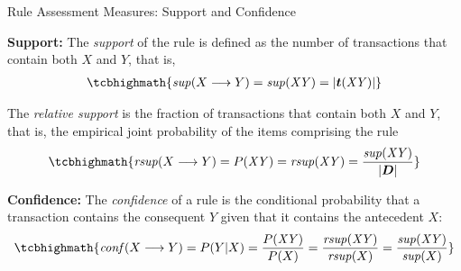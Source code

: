 
\date{Chap.\ 12: Pattern and Rule Assessment}

\begin{frame}
\titlepage
\end{frame}


\newcommand{\lift}{\mathit{lift}}
\newcommand{\leverage}{leverage}
\newcommand{\oddsratio}{oddsratio}
\newcommand{\jaccard}{jaccard}
\newcommand{\conviction}{conv}
\newcommand{\cover}{cover}
\newcommand{\productive}{productive}

\begin{frame}{Rule Assessment Measures: Support and Confidence}

{\bf Support:}
The {\em support} of the rule  is def\/{i}ned as the
number of transactions that contain both $X$ and $Y$, that is,
\begin{align*}
\tcbhighmath{
  \supp(X \arule Y) = \supp(\mathit{XY}) = \card{\vT(\mathit{XY})}
}
\end{align*}

\medskip
The {\em relative support} is
the fraction of transactions that contain both $X$
and $Y$, that is, the empirical
joint probability of the items comprising the rule
\begin{align*}
\tcbhighmath{
  \rsupp(X\arule Y) = P(\mathit{XY}) = \rsupp(\mathit{XY}) = \frac{\supp(\mathit{XY})}{\card{\bD}}
}
\end{align*}

\bigskip
{\bf Conf\/{i}dence:}
The {\em conf\/{i}dence} of a rule
is the conditional probability that
a transaction contains the consequent $Y$ given that it contains the
antecedent $X$:
\begin{align*}
\tcbhighmath{
\conff(X \arule Y) = P(Y|X) = \frac{P(\mathit{XY})}{P(X)} =
\frac{\rsupp(\mathit{XY})}{\rsupp (X)} =
\frac{\supp(\mathit{XY})}{\supp (X)}
}
\end{align*}
\end{frame}



